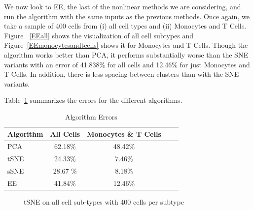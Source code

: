 \documentclass{article}
\begin{document}
We now look to EE, the last of the nonlinear methods we are considering, and run the algorithm with the same inputs as the previous methods. Once again, we take a sample of 400 cells from (i) all cell types and (ii) Monocytes and T Cells. Figure ~\ref{EEall} shows the visualization of all cell subtypes and Figure~\ref{EEmonocytesandtcells} shows it for Monocytes and T Cells. Though the algorithm works better than PCA, it performs substantially worse than the SNE variants with an error of 41.838\% for all cells and 12.46\% for just Monocytes and T Cells. In addition, there is less spacing between clusters than with the SNE variants.

Table~\ref{tableErrors} summarizes the errors for the different algorithms.
\begin{table}[h!]
\caption{Algorithm Errors}
\label{tableErrors}
\begin{center}
\begin{small}
\begin{sc}
\begin{tabular}{lcccr}
\hline
\abovespace\belowspace
Algorithm & All Cells & Monocytes \& T Cells \\
\hline
\abovespace
PCA	& 62.18\% & 48.42\%  \\
tSNE 	& 24.33\%  & 7.46\%\\ 
sSNE	& 28.67 \%  & 8.18\%\\
\belowspace
EE		& 41.84\% &12.46\% \\
\hline
\end{tabular}
\end{sc}
\end{small}
\end{center}
\vskip -0.1in
\end{table}


\begin{figure}[h!]
\begin{center}
\quad
{}\quad
\end{center}
\caption{tSNE on all cell sub-types with 400 cells per subtype}
\label{tSNEall}
\vskip -0.2in
\end{figure}
\end{document}
